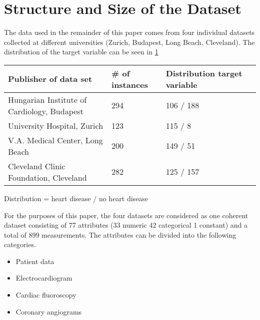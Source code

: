 \section{Structure and Size of the Dataset} \label{sec:dataUnderstanding}


The data used in the remainder of this paper comes from four individual datasets collected at different universities (Zurich, Budapest, Long Beach, Cleveland). The distribution of the target variable can be seen in \cref{table:datasets}
\begin{table}[h]
    \label{table:datasets}
    \begin{footnotesize}
        \begin{tabular}{|l|l|l|l|}
            \hline
            \textbf{Publisher of data set}              & \textbf{\# of instances} & \textbf{Distribution target variable} \\ \hline
            Hungarian Institute of Cardiology, Budapest & 294                      & 106 / 188                             \\ \hline
            University Hospital, Zurich                 & 123                      & 115 / 8                               \\ \hline
            V.A. Medical Center, Long Beach             & 200                      & 149 / 51                              \\ \hline
            Cleveland Clinic Foundation, Cleveland      & 282                      & 125 / 157                             \\ \hline
        \end{tabular}
    \end{footnotesize}
\end{table}
\begin{center}
    \centering
    Distribution = heart disease / no heart disease
\end{center}
For the purposes of this paper, the four datasets are considered as one coherent dataset consisting of 77 attributes (33 numeric 42 categorical 1 constant) and a total of 899 measurements.  
The attributes can be divided into the following categories. 
\begin{multicols}{2}
    \begin{itemize}
        \item Patient data
        \item Electrocardiogram
        \item Cardiac fluoroscopy
        \item Coronary angiograms
    \end{itemize}
\end{multicols}
